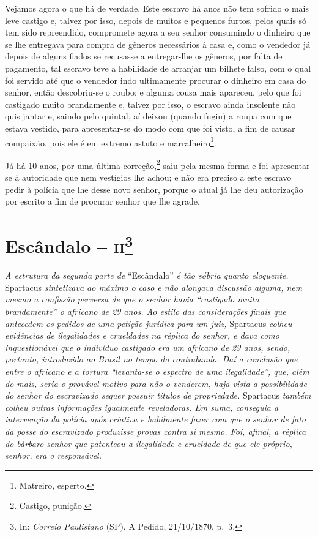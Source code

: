 {Vejamos agora o que há de verdade. Este escravo há anos não tem sofrido
o mais leve castigo e, talvez por isso, depois de muitos e pequenos
furtos, pelos quais só tem sido repreendido, compromete agora a seu
senhor consumindo o dinheiro que se lhe entregava para compra de gêneros
necessários à casa e, como o vendedor já depois de alguns fiados se
recusasse a entregar-lhe os gêneros, por falta de pagamento, tal escravo
teve a habilidade de arranjar um bilhete falso, com o qual foi servido
até que o vendedor indo ultimamente procurar o dinheiro em casa do
senhor, então descobriu-se o roubo; e alguma cousa mais apareceu, pelo
que foi castigado muito brandamente e, talvez por isso, o escravo ainda
insolente não quis jantar e, saindo pelo quintal, aí deixou (quando
fugiu) a roupa com que estava vestido, para apresentar-se do modo com
que foi visto, a fim de causar compaixão, pois ele é em extremo astuto e
marralheiro\footnote{ Matreiro, esperto.}.

Já há 10 anos, por uma última correção,\footnote{ Castigo, punição.}
saiu pela mesma forma e foi apresentar-se à autoridade que nem vestígios
lhe achou; e não era preciso a este escravo pedir à polícia que lhe
desse novo senhor, porque o atual já lhe deu autorização por escrito a
fim de procurar senhor que lhe agrade.

\asterisc{}

\chapter{Escândalo -- \textsc{ii}\footnote{ In: \emph{Correio Paulistano} (SP), A Pedido, 21/10/1870,
  p.~3.}} %

\begin{didascalia}
\emph{A estrutura da segunda parte de} ``Escândalo'' \emph{é tão sóbria
quanto eloquente.} Spartacus \emph{sintetizava ao máximo o caso e não
alongava discussão alguma, nem mesmo a confissão perversa de que o
senhor havia ``castigado muito brandamente'' o africano de 29 anos. Ao
estilo das considerações finais que antecedem os pedidos de uma petição
jurídica para um juiz,} Spartacus \emph{colheu evidências de
ilegalidades e crueldades na réplica do senhor, e dava como
inquestionável que o indivíduo castigado era um africano de 29 anos,
sendo, portanto, introduzido ao Brasil no tempo do contrabando. Daí a
conclusão que entre o africano e a tortura ``levanta-se o espectro de uma
ilegalidade'', que, além do mais, seria o provável motivo para não o
venderem, haja vista a possibilidade do senhor do escravizado sequer
possuir títulos de propriedade.} Spartacus \emph{também colheu outras
informações igualmente reveladoras. Em suma, conseguia a intervenção da
polícia após criativa e habilmente fazer com que o senhor de fato da
posse do escravizado produzisse provas contra si mesmo. Foi, afinal, a
réplica do bárbaro senhor que patenteou a ilegalidade e crueldade de que
ele próprio, senhor, era o responsável.}
\end{didascalia}

}
